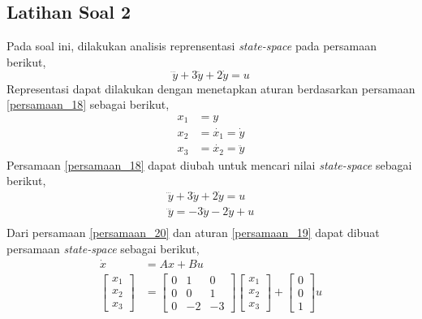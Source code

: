 \documentclass[../cover.tex]{subfiles}
\begin{document}
    \subsection{Latihan Soal 2}
        Pada soal ini, dilakukan analisis reprensentasi \textit{state-space} pada persamaan berikut,
        \begin{equation}
            \dddot{y} + 3\ddot{y} + 2\dot{y} = u
            \label{persamaan_18}
        \end{equation}
        Representasi dapat dilakukan dengan menetapkan aturan berdasarkan persamaan \eqref{persamaan_18} sebagai berikut,
        \begin{equation}
            \begin{split}
                x_1 &= y \\[5pt]
                x_2 &= \dot{x_1} = \dot{y} \\[5pt]
                x_3 &= \dot{x_2} = \ddot{y}
                \label{persamaan_19}
            \end{split}
        \end{equation}
        Persamaan \eqref{persamaan_18} dapat diubah untuk mencari nilai \textit{state-space} sebagai berikut,
        \begin{equation}
            \begin{split}
                \dddot{y} + 3\ddot{y} + 2\dot{y} = u \\[5pt]
                \dddot{y} = - 3\ddot{y} - 2\dot{y} + u \\[5pt]
                \label{persamaan_20}
            \end{split}
        \end{equation}
        Dari persamaan \eqref{persamaan_20} dan aturan \eqref{persamaan_19} dapat dibuat persamaan \textit{state-space} sebagai berikut,
        \begin{equation}
            \begin{split}
                \dot{x} &= Ax +Bu \\[5pt]
                \begin{bmatrix} x_1 \\ x_2 \\ x_3\end{bmatrix} &= \begin{bmatrix} 0 & 1 & 0 \\ 0 & 0 & 1 \\ 0 & -2 & -3 \end{bmatrix} \begin{bmatrix} x_1 \\ x_2 \\ x_3 \end{bmatrix} + \begin{bmatrix} 0 \\ 0 \\ 1 \end{bmatrix} u
                \label{persamaan_21}
            \end{split}
        \end{equation}
\end{document}
